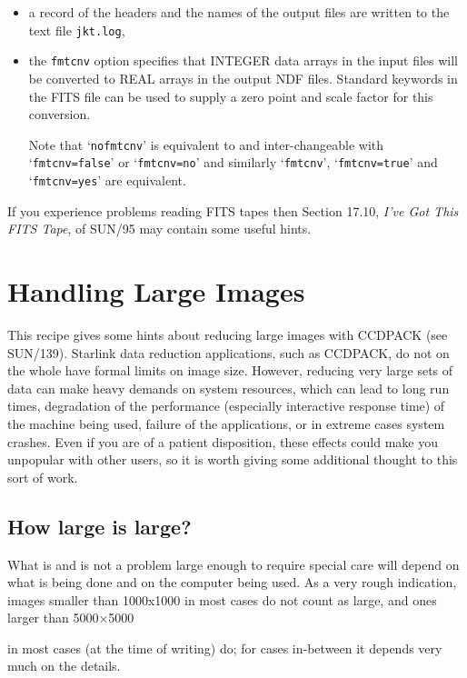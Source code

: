 \documentclass[twoside,11pt]{article}
\newcommand{\html}[1]{}
\newcommand{\latex}[1]{#1}
\newcommand{\xref}[3]{#1}
\newcommand{\xlabel}[1]{}
\begin{document}
\begin{description}
\begin{itemize}
    \item a record of the headers and the names of the output files are
     written to the text file {\tt jkt.log},

    \item the {\tt fmtcnv} option specifies that INTEGER data arrays
     in the input files will be converted to REAL arrays in the output
     NDF files.  Standard keywords in the FITS file can be used to supply
     a zero point and scale factor for this conversion.

     Note that `{\tt nofmtcnv}' is equivalent to and inter-changeable with
     `{\tt fmtcnv=false}' or `{\tt fmtcnv=no}' and similarly `{\tt fmtcnv}',
     `{\tt fmtcnv=true}' and `{\tt fmtcnv=yes}' are equivalent.

  \end{itemize}

\end{description}

If you experience problems reading FITS tapes then Section 17.10, 
\xref{{\it I've Got This FITS Tape}}{sun95}{se_fitsunixtape},
of \xref{SUN/95}{sun95}{}\/\cite{SUN95} may contain some useful hints.


\newpage
\section{\xlabel{LARGE}\label{LARGE}Handling Large Images}


This recipe gives some hints about reducing large images with CCDPACK
(see \xref{SUN/139}{sun139}{}\/\cite{SUN139}).
Starlink data reduction applications, such as CCDPACK, do not on the whole
have formal limits on image size.  However,
reducing very large sets of data can make heavy demands 
on system resources, which
can lead to long run times, degradation of the performance
(especially interactive response time)
of the machine being used,
failure of the applications,
or in extreme cases system crashes.
Even if you are of a patient disposition, 
these effects could make you unpopular with other users,
so it is worth giving some additional thought to this sort of work.

\subsection{\xlabel{HOWLARGE}How large is large?}

What is and is not a problem large enough to require special care
will depend on what is being done and on
the computer being used.
As a very rough indication, images smaller than 1000x1000
in most cases do not
count as large, and ones larger than 
\latex{5000$\times$5000 }
\html{5000x5000 }
in most cases (at the time of writing) do;
for cases in-between it depends very much on the details.
\end{document}
